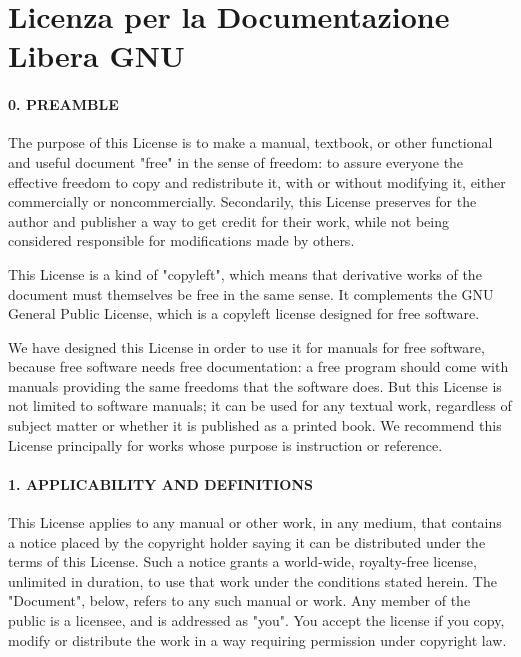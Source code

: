 \section*{Licenza per la Documentazione Libera GNU\label{sec:Licenza-per-la}}
\begin{multicols}{2}

\paragraph{{\footnotesize 0. PREAMBLE}\label{par:0.-PREAMBLE}}

{\footnotesize The purpose of this License is to make a manual, textbook, or other functional and useful document "free" in the sense of freedom: to assure everyone the effective freedom to copy and redistribute it, with or without modifying it, either commercially or noncommercially. Secondarily, this License preserves for the author and publisher a way to get credit for their work, while not being considered responsible for modifications made by others.}{\footnotesize \par}

{\footnotesize This License is a kind of "copyleft", which means that derivative works of the document must themselves be free in the same sense. It complements the GNU General Public License, which is a copyleft license designed for free software.}{\footnotesize \par}

{\footnotesize We have designed this License in order to use it for manuals for free software, because free software needs free documentation: a free program should come with manuals providing the same freedoms that the software does. But this License is not limited to software manuals; it can be used for any textual work, regardless of subject matter or whether it is published as a printed book. We recommend this License principally for works whose purpose is instruction or reference.}{\footnotesize \par}


\paragraph{{\footnotesize 1. APPLICABILITY AND DEFINITIONS}}

{\footnotesize This License applies to any manual or other work, in any medium, that contains a notice placed by the copyright holder saying it can be distributed under the terms of this License. Such a notice grants a world-wide, royalty-free license, unlimited in duration, to use that work under the conditions stated herein. The "Document", below, refers to any such manual or work. Any member of the public is a licensee, and is addressed as "you".  You accept the license if you copy, modify or distribute the work in a way requiring permission under copyright law.}{\footnotesize \par}


\end{multicols}
